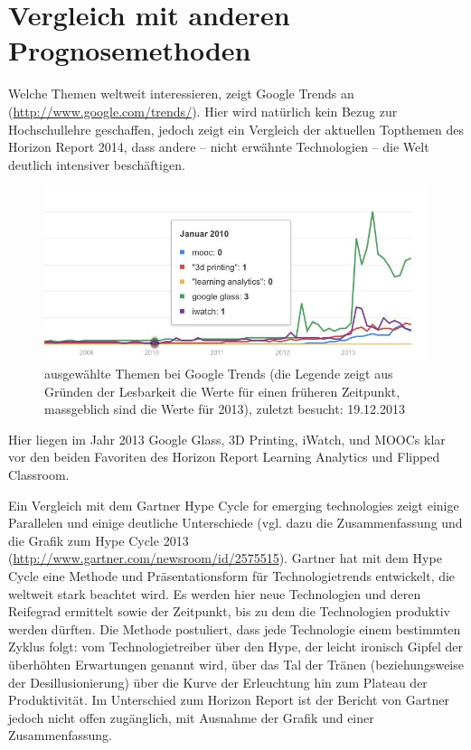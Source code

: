 \documentclass[a4paper,
fontsize=11pt,
oneside,
numbers=noperiodatend,
parskip=half-,
bibliography=totoc,
final
]{scrartcl}
\begin{document}
\section*{Vergleich mit anderen
Prognosemethoden}\label{vergleich-mit-anderen-prognosemethoden}

Welche Themen weltweit interessieren, zeigt Google Trends an
(\url{http://www.google.com/trends/}). Hier wird natürlich kein Bezug
zur Hochschullehre geschaffen, jedoch zeigt ein Vergleich der aktuellen
Topthemen des Horizon Report 2014, dass andere -- nicht erwähnte
Technologien -- die Welt deutlich intensiver beschäftigen.

\begin{figure}[htbp]
\centering
\includegraphics{./img/03-Google_Trends.jpg}
\caption{ausgewählte Themen bei Google Trends (die Legende zeigt aus
Gründen der Lesbarkeit die Werte für einen früheren Zeitpunkt,
massgeblich sind die Werte für 2013), zuletzt besucht: 19.12.2013}
\end{figure}

Hier liegen im Jahr 2013 Google Glass, 3D Printing, iWatch, und MOOCs
klar vor den beiden Favoriten des Horizon Report Learning Analytics und
Flipped Classroom.~

Ein Vergleich mit dem Gartner Hype Cycle for emerging technologies zeigt
einige Parallelen und einige deutliche Unterschiede (vgl. dazu die
Zusammenfassung und die Grafik zum Hype Cycle 2013
(\url{http://www.gartner.com/newsroom/id/2575515}). Gartner hat mit dem
Hype Cycle eine Methode und Präsentationsform für Technologietrends
entwickelt, die weltweit stark beachtet wird. Es werden hier neue
Technologien und deren Reifegrad ermittelt sowie der Zeitpunkt, bis zu
dem die Technologien produktiv werden dürften. Die Methode postuliert,
dass jede Technologie einem bestimmten Zyklus folgt: vom
Technologietreiber über den Hype, der leicht ironisch Gipfel der
überhöhten Erwartungen genannt wird, über das Tal der Tränen
(beziehungsweise der Desillusionierung) über die Kurve der Erleuchtung
hin zum Plateau der Produktivität. Im Unterschied zum Horizon Report ist
der Bericht von Gartner jedoch nicht offen zugänglich, mit Ausnahme der
Grafik und einer Zusammenfassung.
\end{document}
